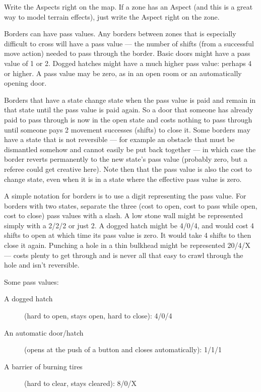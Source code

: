 Write the Aspects right on the map. If a zone has an Aspect (and this is a great way to model terrain effects), just write the Aspect right on the zone.

Borders can have pass values. Any borders between zones that is especially difficult to cross will have a pass value --- the number of shifts (from a successful move action) needed to pass through the border. Basic doors might have a pass value of 1 or 2. Dogged hatches might have a much higher pass value: perhaps 4 or higher. A pass value may be zero, as in an open room or an automatically opening door.

Borders that have a state change state when the pass value is paid and remain in that state until the pass value is paid again. So a door that someone has already paid to pass through is now in the open state and costs nothing to pass through until someone pays 2 movement successes (shifts) to close it. Some borders may have a state that is not reversible --- for example an obstacle that must be dismantled somehow and cannot easily be put back together --- in which case the border reverts permanently to the new state's pass value (probably zero, but a referee could get creative here). Note then that the pass value is also the cost to change state, even when it is in a state where the effective pass value is zero.

A simple notation for borders is to use a digit representing the pass value. For borders with two states, separate the three (cost to open, cost to pass while open, cost to close) pass values with a slash. A low stone wall might be represented simply with a 2/2/2 or just 2. A dogged hatch might be 4/0/4, and would cost 4 shifts to open at which time its pass value is zero. It would take 4 shifts to then close it again. Punching a hole in a thin bulkhead might be represented 20/4/X --- costs plenty to get through and is never all that easy to crawl through the hole and isn't reversible.

Some pass values:

\begin{description}
\item[A dogged hatch] (hard to open, stays open, hard to close): 4/0/4
\item[An automatic door/hatch] (opens at the push of a button and closes automatically): 1/1/1
\item[A barrier of burning tires] (hard to clear, stays cleared): 8/0/X
\end{description}

